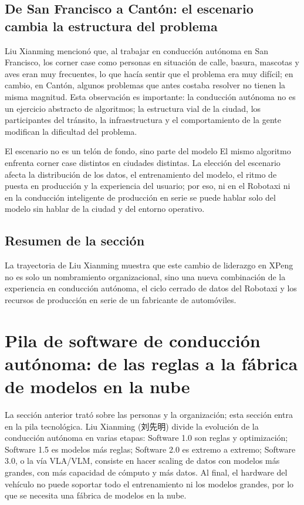 \documentclass[a4paper]{article}
\begin{document}
\subsection{De San Francisco a Cantón: el escenario cambia la estructura del problema}

Liu Xianming mencionó que, al trabajar en conducción autónoma en San Francisco, los corner case como personas en situación de calle, basura, mascotas y aves eran muy frecuentes, lo que hacía sentir que el problema era muy difícil; en cambio, en Cantón, algunos problemas que antes costaba resolver no tienen la misma magnitud. Esta observación es importante: la conducción autónoma no es un ejercicio abstracto de algoritmos; la estructura vial de la ciudad, los participantes del tránsito, la infraestructura y el comportamiento de la gente modifican la dificultad del problema.

\begin{importantbox}{El escenario no es un telón de fondo, sino parte del modelo}
El mismo algoritmo enfrenta corner case distintos en ciudades distintas. La elección del escenario afecta la distribución de los datos, el entrenamiento del modelo, el ritmo de puesta en producción y la experiencia del usuario; por eso, ni en el Robotaxi ni en la conducción inteligente de producción en serie se puede hablar solo del modelo sin hablar de la ciudad y del entorno operativo.
\end{importantbox}

\subsection{Resumen de la sección}

La trayectoria de Liu Xianming muestra que este cambio de liderazgo en XPeng no es solo un nombramiento organizacional, sino una nueva combinación de la experiencia en conducción autónoma, el ciclo cerrado de datos del Robotaxi y los recursos de producción en serie de un fabricante de automóviles.
\section{Pila de software de conducción autónoma: de las reglas a la fábrica de modelos en la nube}

La sección anterior trató sobre las personas y la organización; esta sección entra en la pila tecnológica. Liu Xianming (刘先明) divide la evolución de la conducción autónoma en varias etapas: Software 1.0 son reglas y optimización; Software 1.5 es modelos más reglas; Software 2.0 es extremo a extremo; Software 3.0, o la vía VLA/VLM, consiste en hacer scaling de datos con modelos más grandes, con más capacidad de cómputo y más datos. Al final, el hardware del vehículo no puede soportar todo el entrenamiento ni los modelos grandes, por lo que se necesita una fábrica de modelos en la nube.
\end{document}
